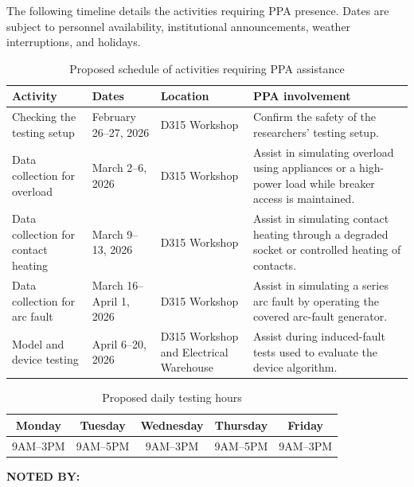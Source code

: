 The following timeline details the activities requiring PPA presence. Dates are
subject to personnel availability, institutional announcements, weather
interruptions, and holidays.
\begin{table}[H]
  \centering
  \caption{Proposed schedule of activities requiring PPA assistance}
  \label{tab:app-g-proposed-schedule}
  \scriptsize
  \setlength{\tabcolsep}{3pt}
  \begin{tabular}{p{}p{}p{}p{}}
    \toprule
    \textbf{Activity} & \textbf{Dates} & \textbf{Location} & \textbf{PPA involvement} \\
    \midrule
    Checking the testing setup & February 26--27, 2026 & D315 Workshop & Confirm the safety of the researchers' testing setup. \\
    Data collection for overload & March 2--6, 2026 & D315 Workshop & Assist in simulating overload using appliances or a high-power load while breaker access is maintained. \\
    Data collection for contact heating & March 9--13, 2026 & D315 Workshop & Assist in simulating contact heating through a degraded socket or controlled heating of contacts. \\
    Data collection for arc fault & March 16--April 1, 2026 & D315 Workshop & Assist in simulating a series arc fault by operating the covered arc-fault generator. \\
    Model and device testing & April 6--20, 2026 & D315 Workshop and Electrical Warehouse & Assist during induced-fault tests used to evaluate the device algorithm. \\
    \bottomrule
  \end{tabular}
\end{table}
\begin{table}[H]
  \centering
  \caption{Proposed daily testing hours}
  \label{tab:app-g-testing-hours}
  \begin{tabular}{ccccc}
    \toprule
    \textbf{Monday} & \textbf{Tuesday} & \textbf{Wednesday} & \textbf{Thursday} & \textbf{Friday} \\
    \midrule
    9AM--3PM & 9AM--5PM & 9AM--3PM & 9AM--5PM & 9AM--3PM \\
    \bottomrule
  \end{tabular}
\end{table}

\vspace{1\baselineskip}
\noindent\textbf{NOTED BY:}

